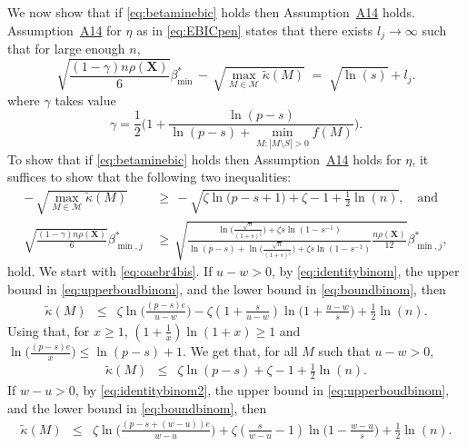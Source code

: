 \documentclass[bj,authoryear]{imsart}
\theoremstyle{plain}
\newcommand{\M}{\mathcal{M}}
\newcommand{\bs}{\boldsymbol}
\begin{document}
We now show that if \eqref{eq:betaminebic} holds then Assumption~\hyperlink{lab:A14}{A14} holds.
Assumption~\hyperlink{lab:A14}{A14} for $\eta$ as in \eqref{eq:EBICpen} states that there exists $l_j\to \infty$ such that for large enough $n$,
    \begin{equation*}
        \sqrt{\frac{(1-\gamma) n\rho(\bs X)}{6}}{{\beta_{\min}^*}} \,- \,\sqrt{\max_{M\in\M}\tilde{\kappa}(M)} \;=\; \sqrt{\ln(s)} + l_j .
    \end{equation*}
where $\gamma$ takes value
\begin{equation}\label{eq:gammaebic}
    \gamma=\frac12\Big(1+\frac{\ln(p-s)}{\ln(p-s)+\min_{M: |M\setminus S|>0}f(M)}\Big).
\end{equation}
To show that if \eqref{eq:betaminebic} holds then Assumption~\hyperlink{lab:A14}{A14} holds for $\eta$, it suffices to show that the following two inequalities:
\begin{align}
    - \,\sqrt{\max_{M\in\M}\tilde{\kappa}(M)} \,&\geq \,-\sqrt{\zeta\ln\big(p-s+1\big)+\zeta-1+\frac{1}{2}\ln(n)}\label{eq:oaebr4bis},\quad\text{and} \\
    \sqrt{\frac{ (1-\gamma)n\rho(\bs X)}{6}}{\beta_{\min,j}^*} \,&\geq \,  \sqrt{\frac{ \ln \big(\tfrac{\sqrt{n}}{(1+s)^{\zeta}}\big)+\zeta s\ln(1-s^{-1})}{\ln(p-s)+ \ln \big(\tfrac{\sqrt{n}}{(1+s)^{\zeta}}\big)+\zeta s\ln(1-s^{-1})}\frac{ n\rho(\bs X)}{12}}{\beta_{\min,j}^*}, \label{eq:oaebr3bis}
\end{align}
hold. We start with \eqref{eq:oaebr4bis}. If $u-w>0$, by \eqref{eq:identitybinom}, the upper bound in \eqref{eq:upperboudbinom}, and the lower bound in \eqref{eq:boundbinom}, then
 \begin{eqnarray*}
     \tilde{\kappa}(M) &\leq& \zeta\ln\Big(\frac{(p-s)e}{u-w}\Big)-\zeta(1+\frac{s}{u-w})\ln\Big(1+\frac{u-w}{s}\Big)+\frac{1}{2}\ln(n).
 \end{eqnarray*}
 Using that, for $x\geq1$, $(1+\frac{1}{x})\ln(1+x)\geq 1$ and $\ln\big(\frac{(p-s)e}{x}\big)\leq \ln(p-s)+1$. We get that, for all $M$ such that $u-w>0$, 
  \begin{eqnarray}\label{eq:pifr} 
     \tilde{\kappa}(M) &\leq& \zeta\ln(p-s)+\zeta-1+\frac{1}{2}\ln(n).
 \end{eqnarray}
If $w-u>0$, by \eqref{eq:identitybinom2}, the upper bound in \eqref{eq:upperboudbinom}, and the lower bound in \eqref{eq:boundbinom}, then
 \begin{eqnarray*}
     \tilde{\kappa}(M) &\leq& 
     \zeta\ln\Big(\frac{(p-s+(w-u))e}{w-u}\Big)+\zeta(\frac{s}{w-u}-1)\ln\Big(1
     -\frac{w-u}{s}\Big)+\frac{1}{2}\ln(n).
 \end{eqnarray*}
\end{document}
